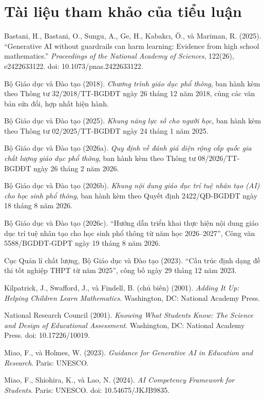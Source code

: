 \section*{Tài liệu tham khảo của tiểu luận}

\begingroup
\small
\setlength{\parindent}{0pt}
\setlength{\parskip}{0.55\baselineskip}

Bastani, H., Bastani, O., Sungu, A., Ge, H., Kabakcı, Ö., và Mariman, R.
(2025).
``Generative AI without guardrails can harm learning: Evidence from high
school mathematics.''
\emph{Proceedings of the National Academy of Sciences}, 122(26),
e2422633122.
doi: 10.1073/pnas.2422633122.

Bộ Giáo dục và Đào tạo (2018).
\emph{Chương trình giáo dục phổ thông}, ban hành kèm theo Thông tư
32/2018/TT-BGDĐT ngày 26 tháng 12 năm 2018, cùng các văn bản sửa đổi, hợp nhất
hiện hành.

Bộ Giáo dục và Đào tạo (2025).
\emph{Khung năng lực số cho người học}, ban hành kèm theo Thông tư
02/2025/TT-BGDĐT ngày 24 tháng 1 năm 2025.

Bộ Giáo dục và Đào tạo (2026a).
\emph{Quy định về đánh giá diện rộng cấp quốc gia chất lượng giáo dục phổ
thông}, ban hành kèm theo Thông tư 08/2026/TT-BGDĐT ngày 26 tháng 2 năm 2026.

Bộ Giáo dục và Đào tạo (2026b).
\emph{Khung nội dung giáo dục trí tuệ nhân tạo (AI) cho học sinh phổ thông}, ban
hành kèm theo Quyết định 2422/QĐ-BGDĐT ngày 18 tháng 8 năm 2026.

Bộ Giáo dục và Đào tạo (2026c).
``Hướng dẫn triển khai thực hiện nội dung giáo dục trí tuệ nhân tạo cho học
sinh phổ thông từ năm học 2026--2027'', Công văn 5588/BGDĐT-GDPT ngày 19
tháng 8 năm 2026.

Cục Quản lí chất lượng, Bộ Giáo dục và Đào tạo (2023).
``Cấu trúc định dạng đề thi tốt nghiệp THPT từ năm 2025'', công bố ngày
29 tháng 12 năm 2023.

Kilpatrick, J., Swafford, J., và Findell, B. (chủ biên) (2001).
\emph{Adding It Up: Helping Children Learn Mathematics}.
Washington, DC: National Academy Press.

National Research Council (2001).
\emph{Knowing What Students Know: The Science and Design of Educational Assessment}.
Washington, DC: National Academy Press.
doi: 10.17226/10019.

Miao, F., và Holmes, W. (2023).
\emph{Guidance for Generative AI in Education and Research}.
Paris: UNESCO.

Miao, F., Shiohira, K., và Lao, N. (2024).
\emph{AI Competency Framework for Students}.
Paris: UNESCO.
doi: 10.54675/JKJB9835.

